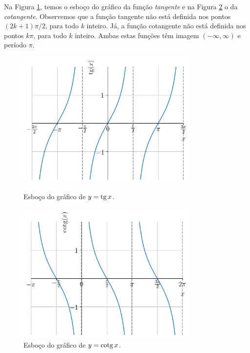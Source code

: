 Na Figura \ref{fig:tg_grafico}, temos o esboço do gráfico da função \emph{tangente} e na Figura \ref{fig:cotg_grafico} o da \emph{cotangente}. Observemos que a função tangente não está definida nos pontos $(2k+1)\pi/2$, para todo $k$ inteiro. Já, a função cotangente não está definida nos pontos $k\pi$, para todo $k$ inteiro. Ambas estas funções têm imagem $(-\infty, \infty)$ e período $\pi$.

\begin{figure}[H]
  \centering
  \includegraphics[width=0.8\textwidth]{./cap_funcao/dados/fig_co_tg_graficos/fig_tg_grafico}\\
  \caption{Esboço do gráfico de $y=\operatorname{tg} x$.}
  \label{fig:tg_grafico}
\end{figure}

\begin{figure}[H]
  \centering
  \includegraphics[width=0.8\textwidth]{./cap_funcao/dados/fig_co_tg_graficos/fig_cotg_grafico}
  \caption{Esboço do gráfico de $y=\operatorname{cotg} x$.}
  \label{fig:cotg_grafico}
\end{figure}

